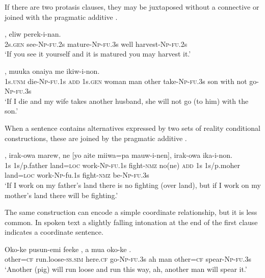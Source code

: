 If there are two protasis clauses, they may be juxtaposed without a connective  or joined with the pragmatic additive  .

\ea%
\label{ex:8:x1635}
,  eliw  perek-i-nan.\\
2s.\textsc{gen} see-\textsc{Np}-\textsc{fu}.2s mature-\textsc{Np}-\textsc{fu}.3s well harvest-\textsc{Np}-\textsc{fu}.2s\\
\glt`If you see it yourself and it is matured you may harvest it.'
\z


\ea%
\label{ex:8:x1643}
, muuka  onaiya  me  ikiw-i-non.\\
1s.\textsc{unm} die-\textsc{Np}-\textsc{fu}.1s \textsc{add} 1s.\textsc{gen} woman  man  other take-\textsc{Np}-\textsc{fu}.3s son  with  not  go-\textsc{Np}-\textsc{fu}.3s\\
\glt`If I die and my wife takes another husband, she will not go (to him) with the son.'
\z


When a sentence contains alternatives expressed by two sets of reality conditional constructions, these are joined by the pragmatic additive .

\ea%
\label{ex:8:x1642}
\gll [Yo  auwa  miiwa=pa  mauw-i-nen],  irak-owa  marew,  ne [yo  aite  miiwa=pa  mauw-i-nen],  irak-owa  ika-i-non.\\
1s  1s/p.father  land=\textsc{loc} work-\textsc{Np}-\textsc{fu}.1s  fight-\textsc{nmz} no(ne) \textsc{add} 1s 1s/p.moher land=\textsc{loc}  work-\textsc{Np}-fu.1s fight-\textsc{nmz} be-\textsc{Np}-\textsc{fu}.3s\\
\glt`If I work on my father's land there is no fighting (over land), but if I work on my mother's land there will be fighting.'
\z


The same construction can encode a simple coordinate relationship, but it is less common. In spoken text a slightly falling intonation at the end of the first clause indicates a coordinate sentence.

\ea%
\label{ex:8:x1850}
\gll Oko-ke  pusun-emi  feeke  \textstyleEmphasizedVernacularWords{-}\textstyleEmphasizedVernacularWords{-},  a  mua oko-ke  \textstyleEmphasizedVernacularWords{-}\textstyleEmphasizedVernacularWords{-}.\\
other=\textsc{cf} run.loose-\textsc{ss}.\textsc{sim} here.\textsc{cf}  go-\textsc{Np}-\textsc{fu}.3s ah man other=\textsc{cf} spear-\textsc{Np}-\textsc{fu}.3s\\
\glt`Another (pig) will run loose and run this way, ah, another man will spear it.'
\z
{}


